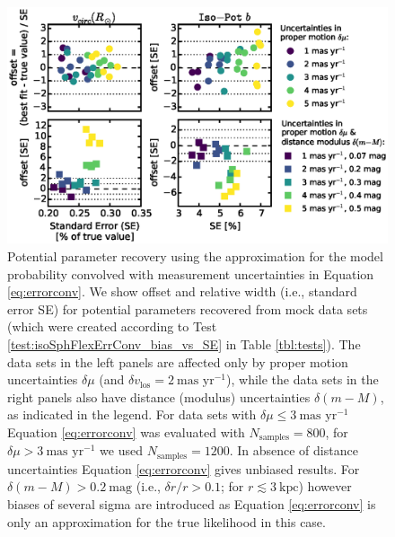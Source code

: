 
\begin{figure}[!htbp]
\centering
\includegraphics[width=\columnwidth]{figs/isoSphFlexErrConv_bias_vs_SE.eps}
\caption{Potential parameter recovery using the approximation for the model probability convolved with measurement uncertainties in Equation \ref{eq:errorconv}. We show  \pdf{} offset and relative width (i.e., standard error SE) for potential parameters recovered from mock data sets (which were created according to Test \ref{test:isoSphFlexErrConv_bias_vs_SE} in Table \ref{tbl:tests}). The data sets in the left panels are affected only by proper motion uncertainties $\delta \mu$ (and $\delta v_\text{los}=2~\text{mas yr}^{-1}$), while the data sets in the right panels also have distance (modulus) uncertainties $\delta (m-M)$, as indicated in the legend. For data sets with $\delta \mu \leq 3 ~\text{mas yr}^{-1}$ Equation \ref{eq:errorconv} was evaluated with $N_\text{samples}=800$, for $\delta \mu > 3~\text{mas yr}^{-1}$ we used $N_\text{samples}=1200$. In absence of distance uncertainties Equation \ref{eq:errorconv} gives unbiased results. For $\delta(m-M) > 0.2~\text{mag}$ (i.e., $\delta r/r > 0.1$; for $r \lesssim 3~\text{kpc}$) however biases of several sigma are introduced as Equation \ref{eq:errorconv} is only an approximation for the true likelihood in this case.}
\label{fig:isoSphFlexErrConv_bias_vs_SE}
\end{figure}





